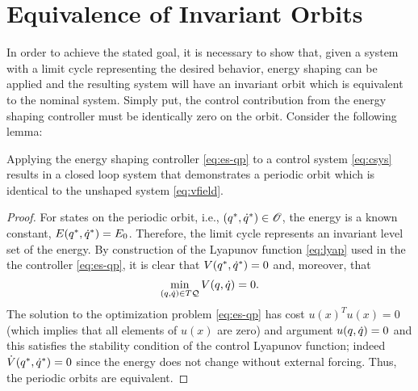 \documentclass[twocolumn]{article}
\begin{document}
\section{Equivalence of Invariant Orbits}
In order to achieve the stated goal, it is necessary to show that, given a system with a limit cycle representing the desired behavior, energy shaping can be applied and the resulting system will have an invariant orbit which is equivalent to the nominal system. Simply put, the control contribution from the energy shaping controller must be identically zero on the orbit. Consider the following lemma:

\begin{lemma}
  Applying the energy shaping controller \eqref{eq:es-qp} to a control system \eqref{eq:csys} results in a closed loop system that demonstrates a periodic orbit which is identical to the unshaped system \eqref{eq:vfield}.
\end{lemma}

\begin{proof}
  For states on the periodic orbit, i.e., $(q^{*}, \dot{q}^{*}) \in \mathscr{O}$, the energy is a known constant, $E(q^{*}, \dot{q}^{*}) = E_{0}$.
  Therefore, the limit cycle represents an invariant level set of the energy.
  By construction of the Lyapunov function \eqref{eq:lyap} used in the the controller \eqref{eq:es-qp}, it is clear that $V(q^{*}, \dot{q}^{*}) = 0$ and, moreover, that $$\min_{(q, \dot{q}) \in T\mathcal{Q}} V(q, \dot{q}) = 0.$$
  The solution to the optimization problem \eqref{eq:es-qp} has cost $u(x)^T u(x) = 0$ (which implies that all elements of $u(x)$ are zero) and argument $u(q, \dot{q}) = 0$ and this satisfies the stability condition of the control Lyapunov function; indeed ${\dot V}(q^{*}, \dot{q}^{*}) = 0$ since the energy does not change without external forcing.
  Thus, the periodic orbits are equivalent.
\end{proof}
\end{document}
